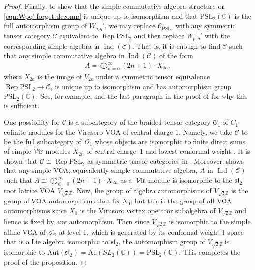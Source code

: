 \documentclass[pdftex]{sigma}
\numberwithin{equation}{section}
\theoremstyle{definition}
\begin{document}
\begin{proof}
Finally, to show that the simple commutative algebra structure on \eqref{eqn:Wpq'-forget-decomp} is unique up to isomorphism and that $\mathrm{PSL}_2(\mathbb{C})$ is the full automorphism group of $W_{p,q}'$, we may replace $\mathcal{C}_{\mathrm{PSL}_2}$ with any symmetric tensor category $\mathcal{C}$ equivalent to $\operatorname{Rep} \mathrm{PSL}_2$ and then replace $W_{p,q}'$ with the corresponding simple algebra in $\operatorname{Ind}(\mathcal{C})$. That is, it is enough to find $\mathcal{C}$ such that any simple commutative algebra in $\operatorname{Ind}(\mathcal{C})$ of the form
\begin{gather*}
A=\bigoplus_{n=0}^\infty (2n+1)\cdot X_{2n},
\end{gather*}
where $X_{2n}$ is the image of $V_{2n}$ under a symmetric tensor equivalence $\operatorname{Rep} \mathrm{PSL}_2\rightarrow\mathcal{C}$, is unique up to isomorphism and has automorphism group $\mathrm{PSL}_2(\mathbb{C})$. See, for example, \cite[Appendix A]{MY-25-Vir} and the last paragraph in the proof of \cite[Theorem 7.1]{MY-25-Vir} for why this is sufficient.

One possibility for $\mathcal{C}$ is a subcategory of the braided tensor category $\mathcal{O}_1$ of $C_1$-cofinite modules for the Virasoro VOA of central charge $1$. Namely, we take $\mathcal{C}$ to be the full subcategory of~$\mathcal{O}_1$ whose objects are isomorphic to finite direct sums of simple $\mathcal{V}{\rm ir}$-modules $X_{2n}$ of central charge~$1$ and lowest conformal weight . It is shown that $\mathcal{C}\cong\operatorname{Rep} \mathrm{PSL}_2$ as symmetric tensor categories in \cite[Example 4.12]{McR-cpt-orb}. Moreover, \cite[Theorem B.1]{MY-25-Vir} shows that any simple VOA, equivalently simple commutative algebra, $A$ in $\operatorname{Ind}(\mathcal{C})$ such that $A\cong\bigoplus_{n=0}^\infty (2n+1)\cdot X_{2n}$ as a~$\mathcal{V}{\rm ir}$-module is isomorphic to the $\mathfrak{sl}_2$-root lattice VOA $V_{\sqrt{2}\mathbb{Z}}$. Now, the group of algebra automorphisms of $V_{\sqrt{2}\mathbb{Z}}$ is the group of VOA automorphisms that fix $X_0$; but this is the group of all VOA automorphisms since $X_0$ is the Virasoro vertex operator subalgebra of $V_{\sqrt{2}\mathbb{Z}}$ and hence is fixed by any automorphism. Then since $V_{\sqrt{2}\mathbb{Z}}$ is isomorphic to the simple affine VOA of~$\mathfrak{sl}_2$ at level $1$, which is generated by its conformal weight $1$ space that is a Lie algebra isomorphic to $\mathfrak{sl}_2$, the automorphism group of $V_{\sqrt{2}\mathbb{Z}}$ is isomorphic to $\mathrm{Aut}(\mathfrak{sl}_2) =\mathrm{Ad}(SL_2(\mathbb{C})) =\mathrm{PSL}_2(\mathbb{C})$. This completes the proof of the proposition.
\end{proof}
\end{document}
